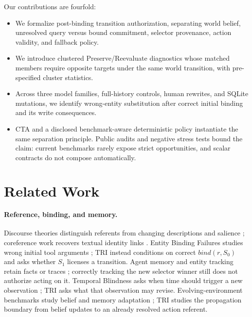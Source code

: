 \documentclass[letterpaper]{article}
\begin{document}
Our contributions are fourfold:
\begin{itemize}
    \item We formalize post-binding transition authorization, separating world belief, unresolved
    query versus bound commitment, selector provenance, action validity, and fallback policy.
    \item We introduce clustered Preserve/Reevaluate diagnostics whose matched members require
    opposite targets under the same world transition, with pre-specified cluster statistics.
    \item Across three model families, full-history controls, human rewrites, and SQLite mutations,
    we identify wrong-entity substitution after correct initial binding and its write consequences.
    \item CTA and a disclosed benchmark-aware deterministic policy instantiate the same separation
    principle. Public audits and negative stress tests bound the claim: current benchmarks rarely
    expose strict opportunities, and scalar contracts do not compose automatically.
\end{itemize}

\section{Related Work}

\paragraph{Reference, binding, and memory.}
Discourse theories distinguish referents from changing descriptions and salience
\cite{kamp1993discourse,grosz1995centering}; coreference work recovers textual identity links
\cite{lee2017coreference,joshi2020spanbert,dasigi2019quoref}. Entity Binding Failures studies
wrong initial tool arguments \cite{babu2026entitybinding}; TRI instead conditions on correct
$bind(r,S_0)$ and asks whether $S_1$ licenses a transition. Agent memory and entity tracking retain
facts or traces \cite{tang2026entitytracking,packer2023memgpt,sumers2024coala,yao2023react};
correctly tracking the new selector winner still does not authorize acting on it. Temporal
Blindness asks when time should trigger a new observation \cite{cheng2026temporalblindness}; TRI
asks what that observation may revise. Evolving-environment benchmarks study belief and memory
adaptation \cite{ji2026clawarena,xu2026evoarena}; TRI studies the propagation boundary from
belief updates to an already resolved action referent.
\end{document}
